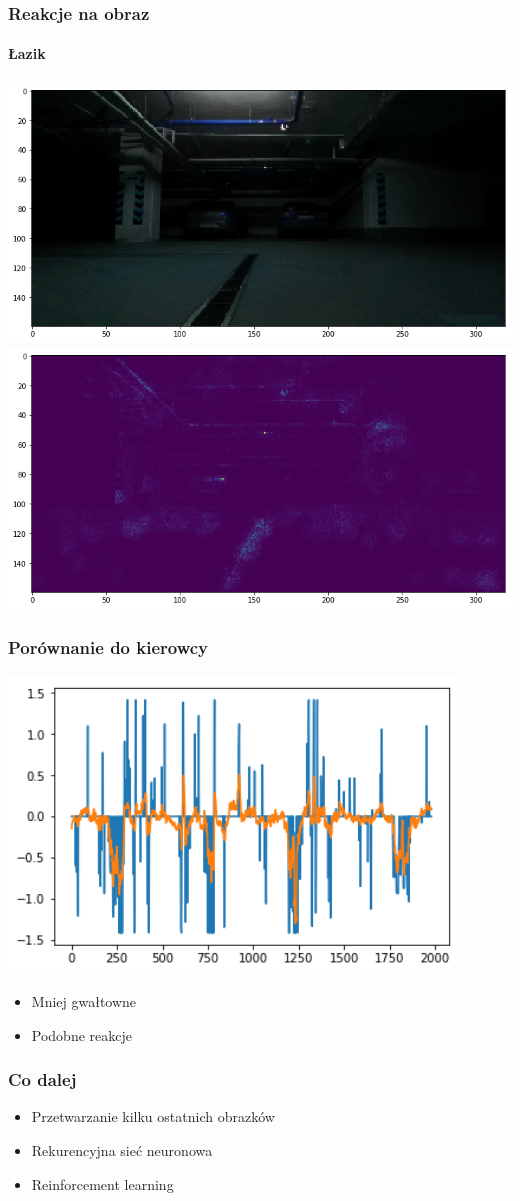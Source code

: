 \documentclass[polish]{beamer}
\begin{document}
\begin{frame}
\frametitle{Reakcje na obraz}
\framesubtitle{Łazik}
\begin{center}
\includegraphics[height=0.42\textheight]{real_img.png}
\includegraphics[height=0.42\textheight]{real_img_act.png}
\end{center}
\end{frame}

\begin{frame}
\frametitle{Porównanie do kierowcy}
\includegraphics[width=0.9\textwidth]{real_data_ang.png}
\begin{itemize}
\item Mniej gwałtowne
\item Podobne reakcje
\end{itemize}
\end{frame}

\begin{frame}
\frametitle{Co dalej}
\begin{itemize}
\item Przetwarzanie kilku ostatnich obrazków
\item Rekurencyjna sieć neuronowa
\item Reinforcement learning
\end{itemize}
\end{frame}
\end{document}
